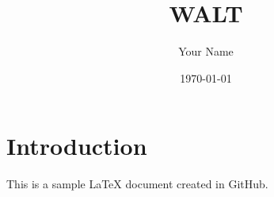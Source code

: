 \documentclass{article}
\begin{document}
\title{WALT}
\author{Your Name}
\date{\today}

\maketitle

\section{Introduction}
This is a sample LaTeX document created in GitHub.
\end{document}
